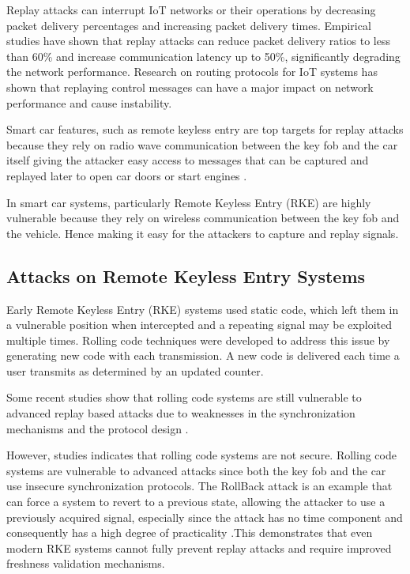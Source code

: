 \documentclass[a4paper,man,12pt]{article}
\begin{document}
Replay attacks can interrupt IoT networks or their operations by decreasing packet delivery percentages and increasing packet delivery times. Empirical studies have shown that replay attacks can reduce packet delivery ratios to less than 60\% and increase communication latency up to 50\%, significantly degrading the network performance\parencite[14]{002}. Research on routing protocols for IoT systems has shown that replaying control messages can have a major impact on network performance and cause instability.\bigbreak

Smart car features, such as remote keyless entry are top targets for replay attacks because they rely on radio wave communication between the key fob and the car itself giving the attacker easy access to messages that can be captured and replayed later to open car doors or start engines \parencite{003}.\bigbreak

In smart car systems, particularly Remote Keyless Entry (RKE) are highly vulnerable because they rely on wireless communication between the key fob and the vehicle. Hence making it easy for the attackers to capture and replay signals\parencite{002B}.

\subsection{Attacks on Remote Keyless Entry Systems}

Early Remote Keyless Entry (RKE) systems used static code, which left them in a vulnerable position when intercepted and a repeating signal may be exploited multiple times. Rolling code techniques were developed to address this issue by generating new code with each transmission. A new code is delivered each time a user transmits as determined by an updated counter.\bigbreak

Some recent studies show that rolling code systems are still vulnerable to advanced replay based attacks due to weaknesses in the synchronization mechanisms and the protocol design \parencite{002B}.\bigbreak

However, studies indicates that rolling code systems are not secure. Rolling code systems are vulnerable to advanced attacks since both the key fob and the car use insecure synchronization protocols. The RollBack attack is an example that can force a system to revert to a previous state, allowing the attacker to use a previously acquired signal, especially since the attack has no time component and consequently has a high degree of practicality \parencite{001B}.This demonstrates that even modern RKE systems cannot fully prevent replay attacks and require improved freshness validation mechanisms.\bigbreak
\end{document}
